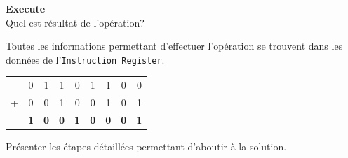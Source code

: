 \begin{Exercice}[5 minutes] \textbf{Execute}\\
    Quel est résultat de l'opération?
    \begin{conseil}
        Toutes les informations permettant d'effectuer l'opération se trouvent dans les données de l'\lstinline{Instruction Register}.
    \end{conseil}
    \begin{solution}
        \begin{tabular}{ccccccccc}
            & 0 & 1 & 1 & 0 & 1 & 1 & 0 & 0 \\
          + & 0 & 0 & 1 & 0 & 0 & 1 & 0 & 1 \\
          \hline
            & \textbf{1} & \textbf{0} & \textbf{0} & \textbf{1} & \textbf{0} & \textbf{0} & \textbf{0} & \textbf{1} \\
          \end{tabular}
    \end{solution}
\end{Exercice}

\begin{conseil} 
    
\end{conseil}
\begin{solution}
    Présenter les étapes détaillées permettant d'aboutir à la solution.
\end{solution}


